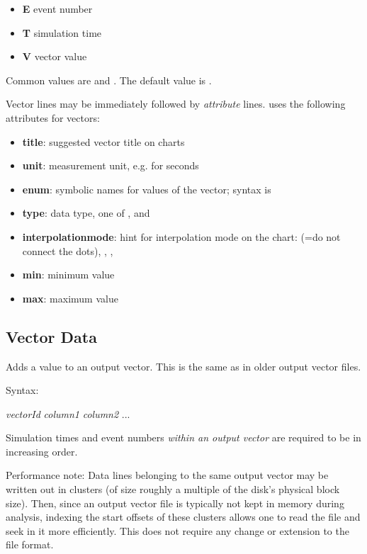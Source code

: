 \begin{itemize}
  \item \textbf{E} event number
  \item \textbf{T} simulation time
  \item \textbf{V} vector value
\end{itemize}

Common values are  and . The default value is .

Vector lines may be immediately followed by \textit{attribute} lines.
{\opp} uses the following attributes for vectors:

\begin{itemize}
    \item \textbf{title}: suggested vector title on charts
    \item \textbf{unit}: measurement unit, e.g.  for seconds
    \item \textbf{enum}: symbolic names for values of the vector;
          syntax is 
    \item \textbf{type}: data type, one of ,  and 
    \item \textbf{interpolationmode}: hint for interpolation mode on the
          chart:  (=do not connect the dots), ,
          , 
    \item \textbf{min}: minimum value
    \item \textbf{max}: maximum value
\end{itemize}


\subsection{Vector Data}
\label{sec:result-file-formats:opp:vector-data}

Adds a value to an output vector. This is the same as in older output
vector files.

Syntax:

\hspace{20mm} \textit{vectorId} \textit{column1} \textit{column2} ...

Simulation times and event numbers \textit{within an output vector} are
required to be in increasing order.

Performance note: Data lines belonging to the same output vector may be
written out in clusters (of size roughly a multiple of the disk's
physical block size). Then, since an output vector file is typically
not kept in memory during analysis, indexing the start offsets of these
clusters allows one to read the file and seek in it more efficiently.
This does not require any change or extension to the file format.

